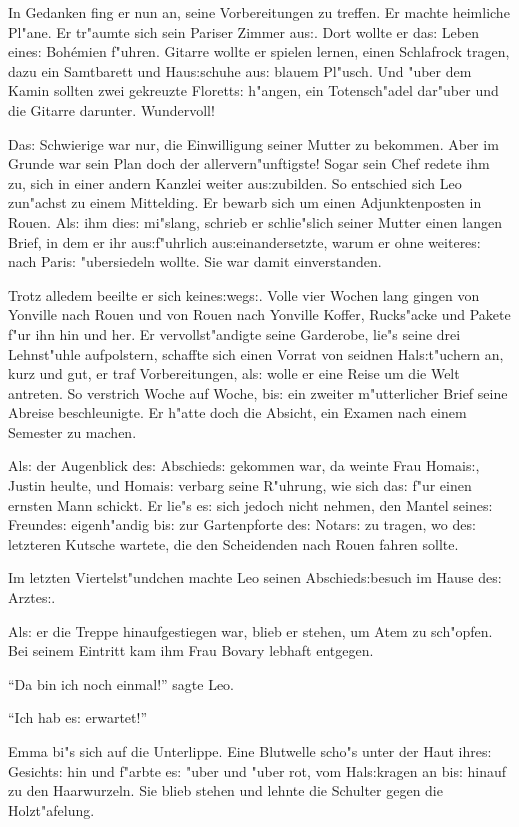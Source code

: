 \documentclass[oneside,12pt]{book}
\newcommand{\s}{s:}%
\begin{document}
In Gedanken fing er nun an, seine Vorbereitungen zu treffen. Er
machte heimliche Pl"ane. Er tr"aumte sich sein Pariser Zimmer
au{\s}. Dort wollte er da{\s} Leben eine{\s} Boh\'emien f"uhren.
Gitarre wollte er spielen lernen, einen Schlafrock tragen, dazu
ein Samtbarett und Hau{\s}schuhe au{\s} blauem Pl"usch. Und "uber
dem Kamin sollten zwei gekreuzte Florett{\s} h"angen, ein
Totensch"adel dar"uber und die Gitarre darunter. Wundervoll!

Da{\s} Schwierige war nur, die Einwilligung seiner Mutter zu
bekommen. Aber im Grunde war sein Plan doch der
allervern"unftigste! Sogar sein Chef redete ihm zu, sich in einer
andern Kanzlei weiter au{\s}zubilden. So entschied sich Leo
zun"achst zu einem Mittelding. Er bewarb sich um einen
Adjunktenposten in Rouen. Al{\s} ihm die{\s} mi"slang, schrieb er
schlie"slich seiner Mutter einen langen Brief, in dem er ihr
au{\s}f"uhrlich au{\s}einandersetzte, warum er ohne weitere{\s}
nach Pari{\s} "ubersiedeln wollte. Sie war damit einverstanden.

Trotz alledem beeilte er sich keine{\s}weg{\s}. Volle vier Wochen
lang gingen von Yonville nach Rouen und von Rouen nach Yonville
Koffer, Rucks"acke und Pakete f"ur ihn hin und her. Er
vervollst"andigte seine Garderobe, lie"s seine drei Lehnst"uhle
aufpolstern, schaffte sich einen Vorrat von seidnen
Hal{\s}t"uchern an, kurz und gut, er traf Vorbereitungen, al{\s}
wolle er eine Reise um die Welt antreten. So verstrich Woche auf
Woche, bi{\s} ein zweiter m"utterlicher Brief seine Abreise
beschleunigte. Er h"atte doch die Absicht, ein Examen nach einem
Semester zu machen.

Al{\s} der Augenblick de{\s} Abschied{\s} gekommen war, da weinte
Frau Homai{\s}, Justin heulte, und Homai{\s} verbarg seine
R"uhrung, wie sich da{\s} f"ur einen ernsten Mann schickt. Er
lie"s e{\s} sich jedoch nicht nehmen, den Mantel seine{\s}
Freunde{\s} eigenh"andig bi{\s} zur Gartenpforte de{\s} Notar{\s}
zu tragen, wo de{\s} letzteren Kutsche wartete, die den
Scheidenden nach Rouen fahren sollte.

Im letzten Viertelst"undchen machte Leo seinen Abschied{\s}besuch
im Hause de{\s} Arzte{\s}.

Al{\s} er die Treppe hinaufgestiegen war, blieb er stehen, um Atem
zu sch"opfen. Bei seinem Eintritt kam ihm Frau Bovary lebhaft
entgegen.

"`Da bin ich noch einmal!"' sagte Leo.

"`Ich hab e{\s} erwartet!"'

Emma bi"s sich auf die Unterlippe. Eine Blutwelle scho"s unter der
Haut ihre{\s} Gesicht{\s} hin und f"arbte e{\s} "uber und "uber
rot, vom Hal{\s}kragen an bi{\s} hinauf zu den Haarwurzeln. Sie
blieb stehen und lehnte die Schulter gegen die Holzt"afelung.
\end{document}
